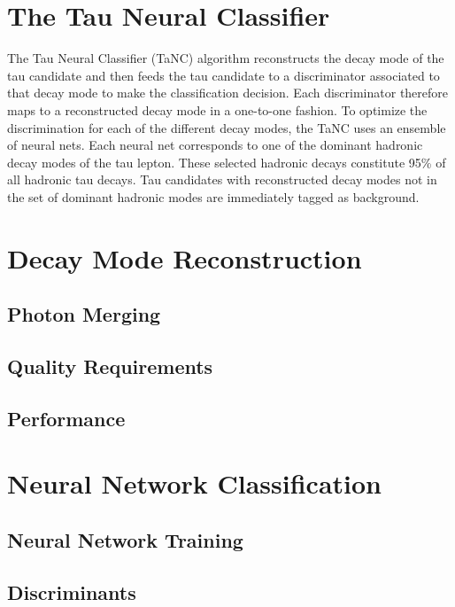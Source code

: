 \section{The Tau Neural Classifier}
\label{sec:Tanc}
%
The Tau Neural Classifier (TaNC) algorithm reconstructs the decay mode of the
tau candidate and then feeds the tau candidate to a discriminator associated
to that decay mode to make the classification decision.  Each discriminator
therefore maps to a reconstructed decay mode in a one-to-one fashion.  To
optimize the discrimination for each of the different decay modes, the TaNC uses
an ensemble of neural nets.  Each neural net corresponds to one of the dominant
hadronic decay modes of the tau lepton.  These selected hadronic decays
constitute 95\% of all hadronic tau decays.  Tau candidates with reconstructed
decay modes not in the set of dominant hadronic modes are immediately tagged as
background.  

\section{Decay Mode Reconstruction}
\label{sec:decay_mode_reco}

\subsection{Photon Merging}

\subsection{Quality Requirements}

\subsection{Performance}


\section{Neural Network Classification}
\label{sec:tanc_nn_training}
\subsection{Neural Network Training}

\subsection{Discriminants}
\label{sec:tanc_nn_discriminants}

